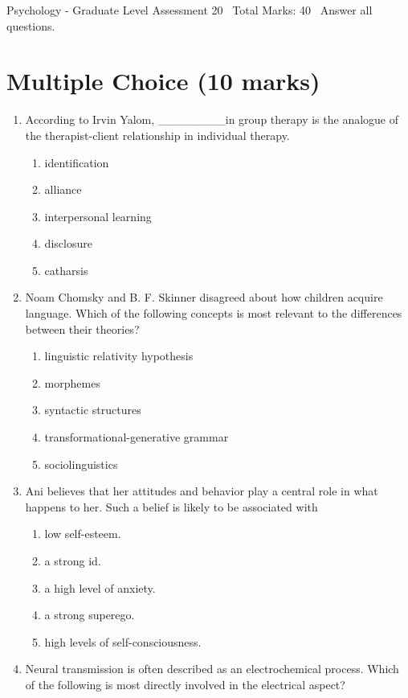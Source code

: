 \documentclass[12pt]{article}
\begin{document}
\begin{center}
Psychology - Graduate Level Assessment 20 \
Total Marks: 40 \
Answer all questions.
\end{center}

\section*{Multiple Choice (10 marks)}
\begin{enumerate}[label=\arabic*.]
\item According to Irvin Yalom, \_\_\_\_\_\_\_\_in group therapy is the analogue of the therapist-client relationship in individual therapy.
\begin{enumerate}[label=(\alph*)]
    \item identification
    \item alliance
    \item interpersonal learning
    \item disclosure
    \item catharsis
\end{enumerate}
\item Noam Chomsky and B. F. Skinner disagreed about how children acquire language. Which of the following concepts is most relevant to the differences between their theories?
\begin{enumerate}[label=(\alph*)]
    \item linguistic relativity hypothesis
    \item morphemes
    \item syntactic structures
    \item transformational-generative grammar
    \item sociolinguistics
\end{enumerate}
\item Ani believes that her attitudes and behavior play a central role in what happens to her. Such a belief is likely to be associated with
\begin{enumerate}[label=(\alph*)]
    \item low self-esteem.
    \item a strong id.
    \item a high level of anxiety.
    \item a strong superego.
    \item high levels of self-consciousness.
\end{enumerate}
\item Neural transmission is often described as an electrochemical process. Which of the following is most directly involved in the electrical aspect?

\end{enumerate}
\end{document}
